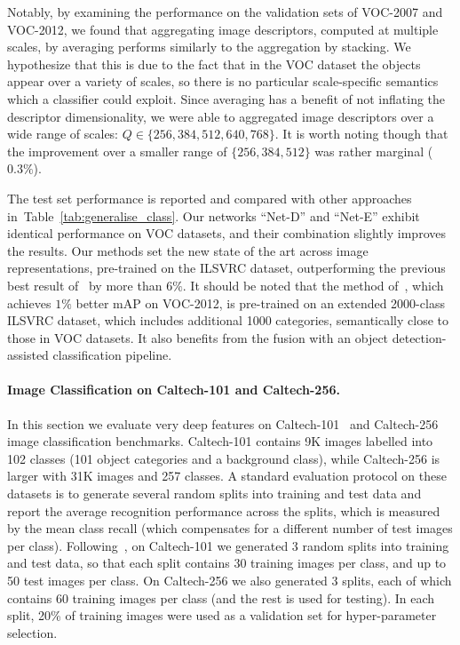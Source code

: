\documentclass{article} %
\newcommand{\tblref}[1]{Table~\ref{#1}}
\begin{document}
Notably, by examining the performance on the validation sets of \mbox{VOC-2007} and VOC-2012, we found that aggregating image descriptors, computed at multiple scales, by averaging performs similarly to the aggregation by stacking.
We hypothesize that this is due to the fact that in the VOC dataset the objects appear over a variety of scales, so there is no particular scale-specific semantics which a classifier could exploit.
Since averaging has a benefit of not inflating the descriptor dimensionality, we were able to aggregated image descriptors over a wide range of scales: $Q \in \{256,384,512,640,768\}$. It is worth noting though that the improvement over a smaller range of $\{256,384,512\}$ was rather marginal ($0.3\%$).

The test set performance is reported and compared with other approaches in~\tblref{tab:generalise_class}. Our networks ``Net-D'' and ``Net-E'' exhibit identical performance on VOC datasets, and their combination slightly improves the results. Our methods set the new state of the art across image representations, pre-trained on the ILSVRC dataset, outperforming the previous best result of~\citet{Chatfield14} by more than $6\%$. It should be noted that the method of~\citet{Wei14}, which achieves $1\%$ better mAP on VOC-2012, is pre-trained on an extended 2000-class ILSVRC dataset, which includes additional 1000 categories, semantically close to those in VOC datasets. It also benefits from the fusion with an object detection-assisted classification pipeline.

\paragraph{Image Classification on Caltech-101 and Caltech-256.}
In this section we evaluate very deep features on \mbox{Caltech-101}~\citep{FeiFei04} and \mbox{Caltech-256}~\citep{Griffin07} image classification benchmarks. Caltech-101 contains 9K images labelled into 102 classes (101 object categories and a background class), while Caltech-256 is larger with 31K images and 257 classes. 
A standard evaluation protocol on these datasets is to generate several random splits into training and test data and report the average recognition performance across the splits, which is measured by the mean class recall (which compensates for a different number of test images per class).
Following~\citet{Chatfield14,Zeiler13,He14}, on Caltech-101 we generated 3 random splits into training and test data, so that each split contains 30 training images per class, and up to 50 test images per class. On Caltech-256 we also generated 3 splits, each of which contains 60 training images per class (and the rest is used for testing). In each split, 20\% of training images were used as a validation set for hyper-parameter selection.
\end{document}
